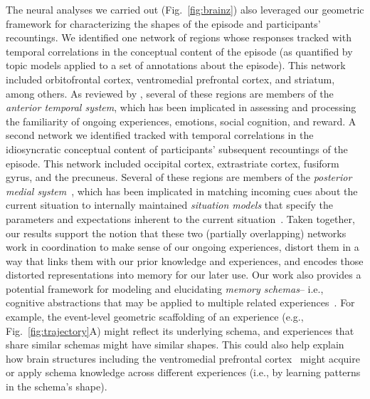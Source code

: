\documentclass[10pt]{article}
\begin{document}
The neural analyses we carried out (Fig.~\ref{fig:brainz}) also leveraged our geometric framework for characterizing the shapes of the episode and participants' recountings.  We identified one network of regions whose responses tracked with temporal correlations in the conceptual content of the episode (as quantified by topic models applied to a set of annotations about the episode).  This network included orbitofrontal cortex, ventromedial prefrontal cortex, and striatum, among others.  As reviewed by \cite{RangRitc12}, several of these regions are members of the \textit{anterior temporal system}, which has been implicated in assessing and processing the familiarity of ongoing experiences, emotions, social cognition, and reward.  A second network we identified tracked with temporal correlations in the idiosyncratic conceptual content of participants' subsequent recountings of the episode.  This network included occipital cortex, extrastriate cortex, fusiform gyrus, and the precuneus.  Several of these regions are members of the \textit{posterior medial system}~\citep{RangRitc12}, which has been implicated in matching incoming cues about the current situation to internally maintained \textit{situation models} that specify the parameters and expectations inherent to the current situation~\citep[also see][]{ZackEtal07, ZwaaRadv98}.  Taken together, our results support the notion that these two (partially overlapping) networks work in coordination to make sense of our ongoing experiences, distort them in a way that links them with our prior knowledge and experiences, and encodes those distorted representations into memory for our later use.  Our work also provides a potential framework for modeling and elucidating \textit{memory schemas}-- i.e., cognitive abstractions that may be applied to multiple related experiences~\citep[e.g.,][]{GilbMarl17, BaldEtal18}.  For example, the event-level geometric scaffolding of an experience (e.g., Fig.~\ref{fig:trajectory}A) might reflect its underlying schema, and experiences that share similar schemas might have similar shapes.  This could also help explain how brain structures including the ventromedial prefrontal cortex~\citep[Fig.~\ref{fig:brainz}; also see][]{GilbMarl17} might acquire or apply schema knowledge across different experiences (i.e., by learning patterns in the schema's shape).
\end{document}
